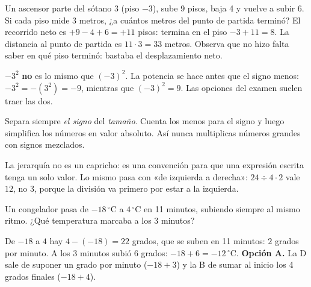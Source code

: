 \begin{ejemplo}
Un ascensor parte del sótano 3 (piso $-3$), sube 9 pisos, baja 4 y vuelve a subir 6. Si cada piso mide 3 metros, ¿a
cuántos metros del punto de partida terminó?
\solucion El recorrido neto es $+9 - 4 + 6 = +11$ pisos: termina en el piso $-3 + 11 = 8$. La distancia al punto de
partida es $11 \cdot 3 = 33$ metros. Observa que no hizo falta saber en qué piso terminó: bastaba el desplazamiento neto.
\end{ejemplo}

\begin{trampa}
$-3^2$ \textbf{no} es lo mismo que $(-3)^2$. La potencia se hace antes que el signo menos: $-3^2 = -(3^2) = -9$, mientras
que $(-3)^2 = 9$. Las opciones del examen suelen traer las dos.
\end{trampa}

\begin{atajo}
Separa siempre \emph{el signo} del \emph{tamaño}. Cuenta los menos para el signo y luego simplifica los números en valor
absoluto. Así nunca multiplicas números grandes con signos mezclados.
\end{atajo}

\begin{profundiza}
La jerarquía no es un capricho: es una convención para que una expresión escrita tenga un solo valor. Lo mismo pasa con
«de izquierda a derecha»: $24 \div 4 \cdot 2$ vale $12$, no $3$, porque la división va primero por estar a la izquierda.
\end{profundiza}

\begin{reto}
Un congelador pasa de $-18\,^{\circ}\mathrm{C}$ a $4\,^{\circ}\mathrm{C}$ en 11 minutos, subiendo siempre al mismo
ritmo. ¿Qué temperatura marcaba a los 3 minutos?\par
{}
\end{reto}

\begin{retoresuelto}
De $-18$ a $4$ hay $4 - (-18) = 22$ grados, que se suben en 11 minutos: $2$ grados por minuto. A los 3 minutos subió
$6$ grados: $-18 + 6 = -12\,^{\circ}\mathrm{C}$. \textbf{Opción A.} La D sale de suponer un grado por minuto ($-18 + 3$) y la B de sumar al inicio los 4 grados finales ($-18 + 4$).
\end{retoresuelto}


